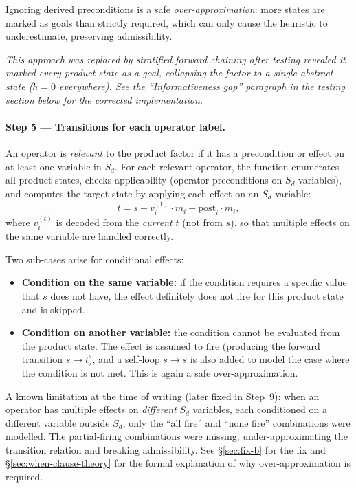 \documentclass[11pt,a4paper]{article}
\begin{document}
Ignoring derived preconditions is a safe \emph{over-approximation}: more states
are marked as goals than strictly required, which can only cause the heuristic
to underestimate, preserving admissibility.

\emph{This approach was replaced by stratified forward chaining after testing
revealed it marked every product state as a goal, collapsing the factor to a
single abstract state ($h = 0$ everywhere).  See the ``Informativeness gap''
paragraph in the testing section below for the corrected implementation.}

\paragraph{Step 5 — Transitions for each operator label.}
An operator is \emph{relevant} to the product factor if it has a precondition or
effect on at least one variable in $S_d$.  For each relevant operator, the
function enumerates all product states, checks applicability (operator
preconditions on $S_d$ variables), and computes the target state by applying
each effect on an $S_d$ variable:
\[
  t = s - v_i^{(t)} \cdot m_i + \mathrm{post}_i \cdot m_i,
\]
where $v_i^{(t)}$ is decoded from the \emph{current} $t$ (not from $s$), so
that multiple effects on the same variable are handled correctly.

Two sub-cases arise for conditional effects:
\begin{itemize}
  \item \textbf{Condition on the same variable:} if the condition requires a
        specific value that $s$ does not have, the effect definitely does not
        fire for this product state and is skipped.
  \item \textbf{Condition on another variable:} the condition cannot be
        evaluated from the product state.  The effect is assumed to fire
        (producing the forward transition $s \to t$), and a self-loop $s \to s$
        is also added to model the case where the condition is not met.  This is
        again a safe over-approximation.
\end{itemize}
A known limitation at the time of writing (later fixed in Step~9): when an
operator has multiple effects on \emph{different} $S_d$ variables, each
conditioned on a different variable outside $S_d$, only the ``all fire'' and
``none fire'' combinations were modelled.  The partial-firing combinations
were missing, under-approximating the transition relation and breaking
admissibility.  See \S\ref{sec:fix-b} for the fix and
\S\ref{sec:when-clause-theory} for the formal explanation of why
over-approximation is required.
\end{document}
